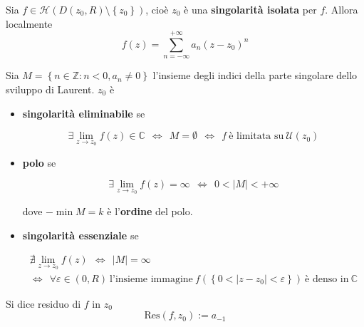 \Soluzione
\begin{thm}
Sia $f\in \mathcal{H}\left( D\left( z_{0} ,R\right) \setminus \left\{z_{0}\right\}\right)$, cioè $z_{0}$ è una \textbf{singolarità isolata} per $f$. Allora localmente
\begin{equation*}
f\left( z\right) =\sum\limits ^{+\infty }_{n=-\infty } a_{n}\left( z-z_{0}\right)^{n}
\end{equation*}
\end{thm}
\begin{thm}
Sia $M=\left\{n\in \mathbb{Z} :n< 0,a_{n} \neq 0\right\}$ l'insieme degli indici della parte singolare dello sviluppo di Laurent. $z_{0}$ è

\begin{itemize}
\item \textbf{singolarità eliminabile} se

\begin{equation*}
\exists \lim\limits _{z\rightarrow z_{0}} f\left( z\right) \in \mathbb{C} \ \ \iff \ \ M=\emptyset \ \ \iff \ \ f\ \text{è limitata su} \ \mathcal{U}\left( z_{0}\right)
\end{equation*}
\item \textbf{polo} se

\begin{equation*}
\exists \lim\limits _{z\rightarrow z_{0}} f\left( z\right) =\infty \ \ \iff \ \ 0< \left| M\right| < +\infty 
\end{equation*}

dove $-\min M=k$ è l'\textbf{ordine} del polo.
\item \textbf{singolarità essenziale} se

\begin{gather*}
\nexists \lim\limits _{z\rightarrow z_{0}} f\left( z\right) \ \ \iff \ \ \left| M\right| =\infty \\
\iff \ \ \forall \varepsilon \in \left( 0,R\right) \ \text{l'insieme immagine} \ f\left(\left\{0< \left| z-z_{0}\right| < \varepsilon \right\}\right) \ \text{è denso in} \ \mathbb{C}
\end{gather*}
\end{itemize}
\end{thm}
\begin{defn}
Si dice residuo di $f$ in $z_{0}$
\begin{equation*}
\mathrm{Res}\left( f,z_{0}\right) :=a_{-1}
\end{equation*}
\end{defn}
